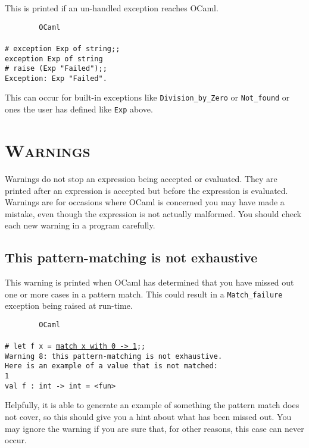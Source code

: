 \documentclass[]{book}
\newcommand{\smspace}{\vspace{4mm}}
\begin{document}
This is printed if an un-handled exception reaches OCaml.

\smspace
\noindent\verb!        OCaml!\\
\noindent\\
\texttt{\# exception Exp of string;;}\\
\texttt{exception Exp of string}\\
\texttt{\# raise (Exp "Failed");;}\\
\texttt{Exception:\ Exp "Failed".}
\smspace

\noindent This can occur for built-in exceptions like \texttt{Division\_by\_Zero} or \texttt{Not\_found} or ones the user has defined like \texttt{Exp} above.

\section*{\scshape Warnings}

Warnings do not stop an expression being accepted or evaluated. They are printed after an expression is accepted but before the expression is evaluated. Warnings are for occasions where OCaml is concerned you may have made a mistake, even though the expression is not actually malformed. You should check each new warning in a program carefully.

\subsection*{This pattern-matching is not exhaustive}

This warning is printed when OCaml has determined that you have missed out one or more cases in a pattern match. This could result in a \texttt{Match\_failure} exception being raised at run-time.

\smspace
\noindent\verb!        OCaml!\\
\noindent\\
\texttt{\# let f x = \underline{match x with 0 -> 1};;}\\
\texttt{Warning 8:\ this pattern-matching is not exhaustive.}\\
\texttt{Here is an example of a value that is not matched:}\\
\texttt{1}\\
\texttt{val f :\ int -> int = <fun>}
\smspace

\noindent Helpfully, it is able to generate an example of something the pattern match does not cover, so this should give you a hint about what has been missed out. You may ignore the warning if you are sure that, for other reasons, this case can never occur.
\end{document}
